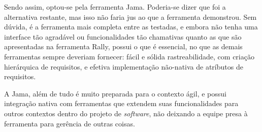 Sendo assim, optou-se pela ferramenta Jama. Poderia-se dizer que foi a alternativa restante, mas isso não faria jus ao que a ferramenta demonstrou. Sem dúvida, é a ferramenta mais completa entre as testadas, e embora não tenha uma interface tão agradável ou funcionalidades tão chamativas quanto as que são apresentadas na ferramenta Rally, possui o que é essencial, no que as demais ferramentas sempre deveriam fornecer: fácil e sólida rastreabilidade, com criação hierárquica de requisitos, e efetiva implementação não-nativa de atríbutos de requisitos.

A Jama, além de tudo é muito preparada para o contexto ágil, e possui integração nativa com ferramentas que extendem suas funcionalidades para outros contextos dentro do projeto de \emph{software}, não deixando a equipe presa à ferramenta para gerência de outras coisas.
